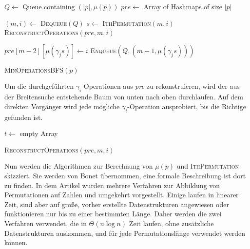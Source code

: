 \documentclass[a4paper, 11pt, ngerman]{article}
\begin{document}
\begin{algorithm}
    $Q \gets$ Queue containing $(|p|, \mu(p))$ \;
    $pre \gets$ Array of Hashmaps of size $|p|$ \;

    {
        $(m, i) \gets $ \textsc{Dequeue}$(Q)$ \;
        $s \gets$ \textsc{IthPermutation}$(m, i)$ \;
        {
            \Return{} \textsc{ReconstructOperations}$(pre, m, i)$ \;
        }

        {
            {
                $pre[m - 2][\mu(\gamma_j s)] \gets i$ \;
                \textsc{Enqueue}$(Q, (m - 1, \mu(\gamma_j s)))$ \;
            }
        }
    }

    \caption{\textsc{MinOperationsBFS}$(p)$}
\end{algorithm}

\noindent Um die durchgeführten $\gamma_i$-Operationen aus \emph{pre} zu rekonstruieren, wird der aus der Breitensuche entstehende Baum von unten nach oben durchlaufen. Auf dem direkten Vorgänger wird jede mögliche $\gamma_i$-Operation ausprobiert, bis die Richtige gefunden ist.

\begin{algorithm}
    $t \gets$ empty Array \;

     \;

    \caption{\textsc{ReconstructOperations}$(pre, m, i)$}
\end{algorithm}

\noindent Nun werden die Algorithmen zur Berechnung von $\mu(p)$ und \textsc{IthPermutation} skizziert. Sie werden von Bonet \cite{permutationranking} übernommen, eine formale Beschreibung ist dort zu finden. In dem Artikel wurden mehrere Verfahren zur Abbildung von Permutationen auf Zahlen und umgekehrt vorgestellt. Einige laufen in linearer Zeit, sind aber auf große, vorher erstellte Datenstrukturen angewiesen oder funktionieren nur bis zu einer bestimmten Länge. Daher werden die zwei Verfahren verwendet, die in $\Theta(n \log n)$ Zeit laufen, ohne zusätzliche Datenstrukturen auskommen, und für jede Permutationslänge verwendet werden können.
\end{document}
